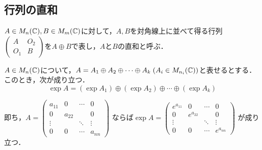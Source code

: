 \documentclass[uplatex,dvipdfmx]{jsreport}
\begin{document}
\subsection{行列の直和}

\begin{definition}
    $A\in M_n(\mathbb{C}),B\in M_m(\mathbb{C})$に対して，$A,B$を対角線上に並べて得る行列$\begin{pmatrix}A&O_2\\O_1&B\end{pmatrix}$を$A\oplus B$で表し，$A$と$B$の直和と呼ぶ．
\end{definition}
\begin{proposition}
    $A\in M_n(\mathbb{C})$について，$A=A_1\oplus A_2\oplus\cdots\oplus A_k\;(A_i\in M_{n_i}(\mathbb{C}))$と表せるとする．
    このとき，次が成り立つ．
    \[ \exp A=(\exp A_1)\oplus (\exp A_2)\oplus\cdots\oplus(\exp A_k) \]
\end{proposition}
\begin{example}
    即ち，$A=\begin{pmatrix}a_{11}&0&\cdots&0\\0&a_{22}&&0\\\vdots&&\ddots&\vdots\\0&0&\cdots&a_{nn}\end{pmatrix}$
    ならば$\exp A=\begin{pmatrix}e^{a_{11}}&0&\cdots&0\\0&e^{a_{22}}&&0\\\vdots&&\ddots&\vdots\\0&0&\cdots&e^{a_{nn}}\end{pmatrix}$
    が成り立つ．
\end{example}
\end{document}

